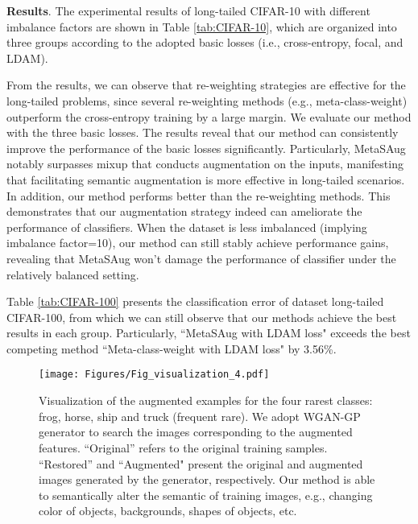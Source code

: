 \textbf{Results}. 
\label{comparision_results}
The experimental results of long-tailed CIFAR-10 with different imbalance factors are shown in Table \ref{tab:CIFAR-10}, which are organized into three groups according to the adopted basic losses (i.e., cross-entropy, focal, and LDAM). 

From the results, we can observe that re-weighting strategies are effective for the long-tailed problems, since several re-weighting methods (e.g., meta-class-weight) outperform the cross-entropy training by a large margin. We evaluate our method with the three basic losses. The results reveal that our method can consistently improve the performance of the basic losses significantly. Particularly, MetaSAug notably surpasses mixup that conducts augmentation on the inputs, manifesting that facilitating semantic augmentation is more effective in long-tailed scenarios. In addition, our method performs better than the re-weighting methods. This demonstrates that our augmentation strategy indeed can ameliorate the performance of classifiers. When the dataset is less imbalanced (implying imbalance factor=10), our method can still stably achieve performance gains, revealing that MetaSAug won't 
damage the performance of classifier under the relatively balanced setting.

Table \ref{tab:CIFAR-100} presents the classification error of dataset long-tailed CIFAR-100, from which we can still observe that our methods achieve the best results in each group. Particularly, ``MetaSAug with LDAM loss" exceeds the best competing method ``Meta-class-weight with LDAM loss" by 3.56\%.


\begin{figure*}[htbp]\centering
	\setlength{\abovecaptionskip}{0.cm}
	\setlength{\belowcaptionskip}{0.cm}
	\centering
	\texttt{[image: Figures/Fig\_visualization\_4.pdf]}
	\caption{Visualization of the augmented examples for the four rarest classes: frog, horse, ship and truck (frequent  rare). We adopt WGAN-GP \cite{WGAN-GP} generator to search the images corresponding to the augmented features. ``Original'' refers to the original training samples. ``Restored'' and ``Augmented" present the original and augmented images generated by the generator, respectively. Our method is able to semantically alter the semantic of training images, e.g., changing color of objects, backgrounds, shapes of objects, etc.}
	\label{fig:visualization}
	
\end{figure*}



